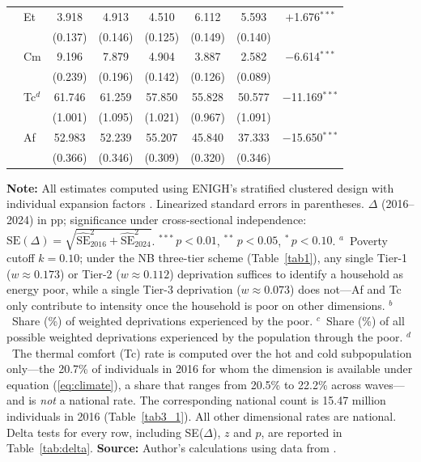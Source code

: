 \documentclass[11pt, a4paper]{article}
\begin{document}
\begin{table}[htbp]
\begin{tabularx}{\textwidth}{l X cccccc}
& Et & 3.918 & 4.913 & 4.510 & 6.112 & 5.593 & $+$1.676$^{***}$ \\
&    & {\footnotesize (0.137)} & {\footnotesize (0.146)} & {\footnotesize (0.125)} & {\footnotesize (0.149)} & {\footnotesize (0.140)} & \\
& Cm & 9.196 & 7.879 & 4.904 & 3.887 & 2.582 & $-$6.614$^{***}$ \\
&    & {\footnotesize (0.239)} & {\footnotesize (0.196)} & {\footnotesize (0.142)} & {\footnotesize (0.126)} & {\footnotesize (0.089)} & \\
& Tc$^d$ & 61.746 & 61.259 & 57.850 & 55.828 & 50.577 & $-$11.169$^{***}$ \\
&    & {\footnotesize (1.001)} & {\footnotesize (1.095)} & {\footnotesize (1.021)} & {\footnotesize (0.967)} & {\footnotesize (1.091)} & \\
& Af & 52.983 & 52.239 & 55.207 & 45.840 & 37.333 & $-$15.650$^{***}$ \\
&    & {\footnotesize (0.366)} & {\footnotesize (0.346)} & {\footnotesize (0.309)} & {\footnotesize (0.320)} & {\footnotesize (0.346)} & \\[4pt]
\bottomrule
\end{tabularx}
\begin{justify}
\scriptsize
\textbf{Note:} All estimates computed using ENIGH's stratified clustered design with individual expansion factors \parencite{inegi2023}. Linearized standard errors in parentheses. $\Delta$ (2016--2024) in pp; significance under cross-sectional independence: $\mathrm{SE}(\Delta)=\sqrt{\widehat{\mathrm{SE}}_{2016}^2+\widehat{\mathrm{SE}}_{2024}^2}$. $^{***}$\,$p<0.01$, $^{**}$\,$p<0.05$, $^{*}$\,$p<0.10$. $^a$~Poverty cutoff $k=0.10$; under the NB three-tier scheme (Table~\ref{tab1}), any single Tier-1 ($w \approx 0.173$) or Tier-2 ($w \approx 0.112$) deprivation suffices to identify a household as energy poor, while a single Tier-3 deprivation ($w \approx 0.073$) does not---Af and Tc only contribute to intensity once the household is poor on other dimensions. $^b$~Share (\%) of weighted deprivations experienced by the poor. $^c$~Share (\%) of all possible weighted deprivations experienced by the population through the poor. $^d$~The thermal comfort (Tc) rate is computed over the hot and cold subpopulation only---the 20.7\% of individuals in 2016 for whom the dimension is available under equation (\ref{eq:climate}), a share that ranges from 20.5\% to 22.2\% across waves---and is \emph{not} a national rate. The corresponding national count is 15.47 million individuals in 2016 (Table~\ref{tab3_1}). All other dimensional rates are national. Delta tests for every row, including SE($\Delta$), $z$ and $p$, are reported in Table~\ref{tab:delta}. \textbf{Source:} Author's calculations using data from \textcite{enigh2016, enigh2018, enigh2020, enigh2022, enigh2024}.
\end{justify}
\label{tab3}
\end{table}
\end{document}
